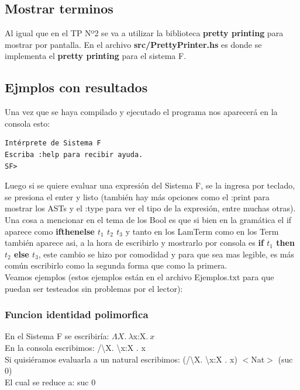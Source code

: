 \documentclass[12pt, titlepage, a4paper]{article}
\begin{document}
\subsection{Mostrar terminos}
Al igual que en el TP Nº2 \cite{tp2:lambdaCalculoSimpleTipado} se va a utilizar la biblioteca \textbf{pretty printing} para mostrar por 
pantalla. En el archivo
\textbf{src/PrettyPrinter.hs} es donde se implementa el \textbf{pretty printing} para el sistema F.

\subsection{Ejmplos con resultados}
Una vez que se haya compilado y ejecutado el programa nos aparecerá en la consola esto:

\begin{verbatim}
Intérprete de Sistema F
Escriba :help para recibir ayuda.
SF>
\end{verbatim}


Luego si se quiere evaluar una expresión del Sistema F, se la ingresa por teclado, se presiona el enter y listo 
(también hay más opciones como el :print para mostrar los ASTs y el :type para ver el tipo de la expresión, entre muchas otras). \\

Una cosa a mencionar en el tema de los Bool es que si bien en la gramática el if aparece como \textbf{ifthenelse $t_1$ $t_2$ $t_3$} y 
tanto en los LamTerm como en los Term también aparece asi, a la hora de escribirlo y mostrarlo por consola es 
\textbf{if $t_1$ then $t_2$ else $t_3$}, este cambio se hizo por comodidad y para que sea mas legible, es más común escribirlo como la segunda forma que como 
la primera.\\

Veamos ejemplos (estos ejemplos están en el archivo Ejemplos.txt para que puedan ser testeados sin problemas por el lector):

\subsubsection{Funcion identidad polimorfica}
\noindent En el Sistema F se escribiría: $\Lambda X.\ \lambda $x:X$. \ x$ \\
En la consola escribimos: /\textbackslash X. \textbackslash x:X . x \\
Si quisiéramos evaluarla a un natural escribimos: (/\textbackslash X. \textbackslash x:X . x)  $<$Nat$>$ (suc 0) \\
El cual se reduce a: suc 0
\end{document}
